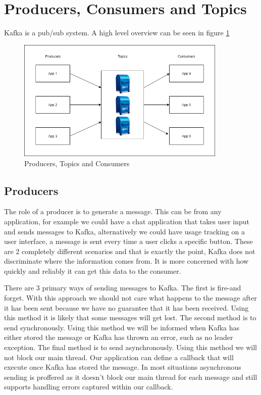 \section{Producers, Consumers and Topics}

Kafka is a pub/sub system. A high level overview can be seen in figure \ref{fig:producers-topics-consumers}

\begin{figure}[H]
  \centering
  \includegraphics[scale=0.5,width=100mm]{./images/kafka-producrs-consumers-topics.png}
  \caption{Producers, Topics and Consumers}
  \label{fig:producers-topics-consumers}
\end{figure}

\subsection{Producers}

The role of a producer is to generate a message. This can be from any application, for example we could have a chat application that takes user input and sends messages to Kafka, alternatively we could have usage tracking on a user interface, a message is sent every time a user clicks a specific button. These are 2 completely different scenarios and that is exactly the point, Kafka does not discriminate where the information comes from. It is more concerned with how quickly and reliably it can get this data to the consumer.

There are 3 primary ways of sending messages to Kafka. The first is fire-and forget. With this approach we should not care what happens to the message after it has been sent because we have no guarantee that it has been received. Using this method it is likely that some messages will get lost. The second method is to send synchronously. Using this method we will be informed when Kafka has either stored the message or Kafka has thrown an error, such as no leader exception. The final method is to send asynchronously. Using this method we will not block our main thread. Our application can define a callback that will execute once Kafka has stored the message. In most situations asynchronous sending is proffered as it doesn't block our main thread for each message and still supports handling errors captured within our callback.

